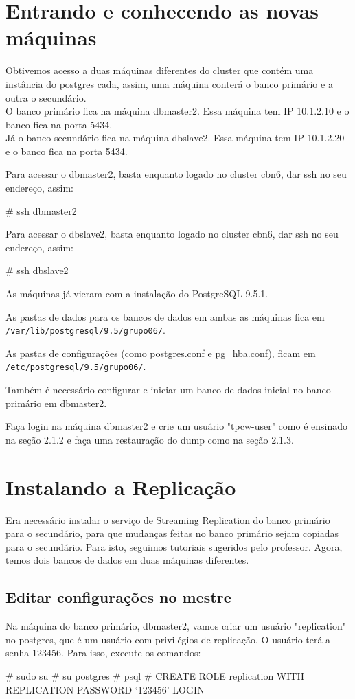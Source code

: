 \documentclass[a4paper,10pt]{article}
\begin{document}
\section{Entrando e conhecendo as novas máquinas}
    Obtivemos acesso a duas máquinas diferentes do cluster que contém uma instância do postgres cada, assim, uma máquina conterá o banco primário e a outra o secundário.\\
    O banco primário fica na máquina dbmaster2. Essa máquina tem IP 10.1.2.10 e o banco fica na porta 5434.\\
    Já o banco secundário fica na máquina dbslave2. Essa máquina tem IP 10.1.2.20 e o banco fica na porta 5434.

    Para acessar o dbmaster2, basta enquanto logado no cluster cbn6, dar ssh no seu endereço, assim:
    \begin{spverbatim}
    # ssh dbmaster2
    \end{spverbatim}

    Para acessar o dbslave2, basta enquanto logado no cluster cbn6, dar ssh no seu endereço, assim:
    \begin{spverbatim}
    # ssh dbslave2
    \end{spverbatim}

    As máquinas já vieram com a instalação do PostgreSQL 9.5.1.

    As pastas de dados para os bancos de dados em ambas as máquinas fica em \verb|/var/lib/postgresql/9.5/grupo06/|.

    As pastas de configurações (como postgres.conf e pg\_hba.conf), ficam em \verb|/etc/postgresql/9.5/grupo06/|.

    Também é necessário configurar e iniciar um banco de dados inicial no banco primário em dbmaster2.

    Faça login na máquina dbmaster2 e crie um usuário "tpcw-user" como é ensinado na seção 2.1.2 e faça uma restauração do dump como na seção 2.1.3.

\section{Instalando a Replicação}
    Era necessário instalar o serviço de Streaming Replication do banco primário para o secundário, para que mudanças feitas no banco primário sejam copiadas para o secundário. Para isto, seguimos tutoriais sugeridos pelo professor.
    Agora, temos dois bancos de dados em duas máquinas diferentes.
    \subsection{Editar configurações no mestre}
      Na máquina do banco primário, dbmaster2, vamos criar um usuário "replication" no postgres, que é um usuário com privilégios de replicação. O usuário terá a senha 123456. Para isso, execute os comandos:
      \begin{spverbatim}
      # sudo su
      # su postgres
      # psql
      # CREATE ROLE replication WITH REPLICATION PASSWORD ‘123456’ LOGIN
      \end{spverbatim}
\end{document}

